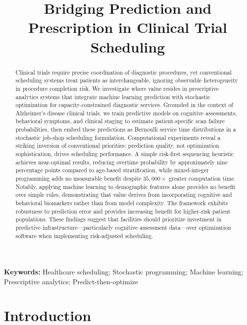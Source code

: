 \documentclass[msom,blindrev]{informs3}
\title{Bridging Prediction and Prescription in Clinical Trial Scheduling}
\begin{document}
\maketitle


\begin{abstract}
Clinical trials require precise coordination of diagnostic procedures, yet conventional scheduling systems treat patients as interchangeable, ignoring observable heterogeneity in procedure completion risk. We investigate where value resides in prescriptive analytics systems that integrate machine learning prediction with stochastic optimization for capacity-constrained diagnostic services. Grounded in the context of Alzheimer's disease clinical trials, we train predictive models on cognitive assessments, behavioral symptoms, and clinical staging to estimate patient-specific scan failure probabilities, then embed these predictions as Bernoulli service time distributions in a stochastic job-shop scheduling formulation. Computational experiments reveal a striking inversion of conventional priorities: prediction quality, not optimization sophistication, drives scheduling performance. A simple risk-first sequencing heuristic achieves near-optimal results, reducing overtime probability by approximately nine percentage points compared to age-based stratification, while mixed-integer programming adds no measurable benefit despite $35{,}000\times$ greater computation time. Notably, applying machine learning to demographic features alone provides no benefit over simple rules, demonstrating that value derives from incorporating cognitive and behavioral biomarkers rather than from model complexity. The framework exhibits robustness to prediction error and provides increasing benefit for higher-risk patient populations. These findings suggest that facilities should prioritize investment in predictive infrastructure---particularly cognitive assessment data---over optimization software when implementing risk-adjusted scheduling.
\end{abstract}

\noindent\textbf{Keywords:} Healthcare scheduling; Stochastic programming; Machine learning; Prescriptive analytics; Predict-then-optimize



\section{Introduction}
\end{document}
